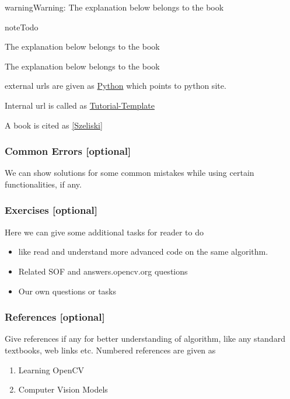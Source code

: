 \documentclass[letterpaper,10pt,english]{sphinxmanual}
\begin{document}
\begin{notice}{warning}{Warning:}
The explanation below belongs to the book
\end{notice}

\begin{notice}{note}{Todo}

The explanation below belongs to the book
\end{notice}




The explanation below belongs to the book



external urls are given as \href{http://www.python.org}{Python} which points to python site.

Internal url is called as {\hyperref[py_tutorials/py_setup/py_tutorial_template/py_tutorial_template:tutorial-template]{Tutorial-Template}}

A book is cited as {\hyperref[py_tutorials/py_setup/py_tutorial_template/py_tutorial_template:szeliski]{{[}Szeliski{]}}}


\subsubsection{Common Errors {[}optional{]}}
\label{py_tutorials/py_setup/py_tutorial_template/py_tutorial_template:common-errors-optional}
We can show solutions for some common mistakes while using certain functionalities, if any.


\subsubsection{Exercises {[}optional{]}}
\label{py_tutorials/py_setup/py_tutorial_template/py_tutorial_template:exercises-optional}
Here we can give some additional tasks for reader to do
\begin{itemize}
\item {} 
like read and understand more advanced code on the same algorithm.

\item {} 
Related SOF and answers.opencv.org questions

\item {} 
Our own questions or tasks

\end{itemize}


\subsubsection{References {[}optional{]}}
\label{py_tutorials/py_setup/py_tutorial_template/py_tutorial_template:references-optional}
Give references if any for better understanding of algorithm, like any standard textbooks, web links etc. Numbered references are given as
\begin{enumerate}
\item {} 
Learning OpenCV

\item {} 
Computer Vision Models

\end{enumerate}
\end{document}
